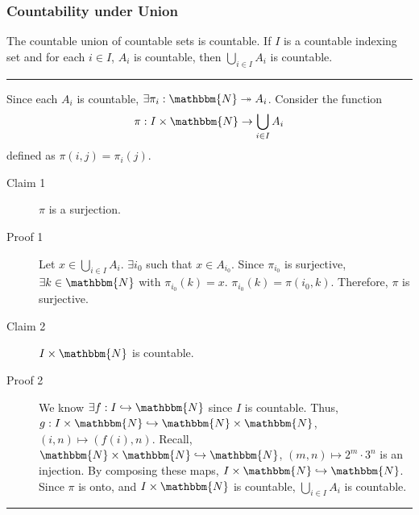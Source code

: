 \documentclass[10pt]{extarticle}
\newcommand{\N}{\mathbbm{N}}
\begin{document}
    \subsubsection{Countability under Union}%
      The countable union of countable sets is countable. If $I$ is a countable indexing set and for each $i\in I$, $A_i$ is countable, then $\bigcup\limits_{i\in I} A_i$ is countable.\\
      \vspace{4pt}
      \rule{\textwidth}{0.4pt}
      \vspace{4pt}
      Since each $A_i$ is countable, $\exists \pi_i: \N \twoheadrightarrow A_i$. Consider the function
      \[
        \pi: I\times\N \rightarrow \bigcup_{i\in I}A_i
      \] 
      defined as $\pi(i,j) = \pi_i(j)$.
      \begin{description}
        \item[Claim 1] $\pi$ is a surjection.
        \item[Proof 1] Let $x\in \bigcup_{i\in I}A_i$. $\exists i_0$ such that $x\in A_{i_0}$. Since $\pi_{i_0}$ is surjective, $\exists k\in \N$ with $\pi_{i_0}(k) = x$. $\pi_{i_0}(k) = \pi(i_0,k)$. Therefore, $\pi$ is surjective.
        \item[Claim 2] $I\times\N$ is countable.
        \item[Proof 2] We know $\exists f: I\hookrightarrow\N$ since $I$ is countable. Thus, $g:I\times\N\hookrightarrow\N\times\N$, $(i,n)\mapsto (f(i),n)$. Recall, $\N\times\N\hookrightarrow \N$, $(m,n)\mapsto 2^m\cdot3^n$ is an injection. By composing these maps, $I\times\N\hookrightarrow\N$. Since $\pi$ is onto, and $I\times\N$ is countable, $\bigcup_{i\in I} A_i$ is countable.
      \end{description}
      \vspace{4pt}
      \rule{\textwidth}{0.4pt}
\end{document}
